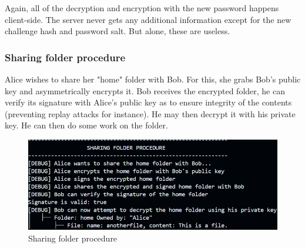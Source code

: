 Again, all of the decryption and encryption with the new password happens client-side. The server never gets any additional information except for the new challenge hash and password salt. But alone, these are useless.

\subsubsection{Sharing folder procedure}
Alice wishes to share her "home" folder with Bob. For this, she grabs Bob's public key and asymmetrically encrypts it. Bob receives the encrypted folder, he can verify its signature with Alice's public key as to ensure integrity of the contents (preventing replay attacks for instance). He may then decrypt it with his private key. He can then do some work on the folder.

\begin{figure}[H]
    \centering
    \includegraphics[width=\textwidth]{screenshots/share_procedure.png}
    \caption{Sharing folder procedure}
    \label{fig:share_procedure}
\end{figure}




